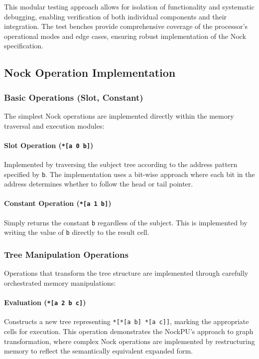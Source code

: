 \documentclass[twoside]{article}
\begin{document}
\noindent
This modular testing approach allows for isolation of functionality and systematic debugging, enabling verification of both individual components and their integration. The test benches provide comprehensive coverage of the processor's operational modes and edge cases, ensuring robust implementation of the Nock specification.

\subsection{Nock Operation Implementation}

\subsubsection{Basic Operations (Slot, Constant)}

The simplest Nock operations are implemented directly within the memory traversal and execution modules:

\paragraph{Slot Operation (\texttt{*[a 0 b]})} Implemented by traversing the subject tree according to the address pattern specified by \texttt{b}. The implementation uses a bit-wise approach where each bit in the address determines whether to follow the head or tail pointer.

\paragraph{Constant Operation (\texttt{*[a 1 b]})} Simply returns the constant \texttt{b} regardless of the subject. This is implemented by writing the value of \texttt{b} directly to the result cell.

\subsubsection{Tree Manipulation Operations}

Operations that transform the tree structure are implemented through carefully orchestrated memory manipulations:

\paragraph{Evaluation (\texttt{*[a 2 b c]})} Constructs a new tree representing \texttt{*[*[a b] *[a c]]}, marking the appropriate cells for execution. This operation demonstrates the NockPU's approach to graph transformation, where complex Nock operations are implemented by restructuring memory to reflect the semantically equivalent expanded form.
\end{document}
